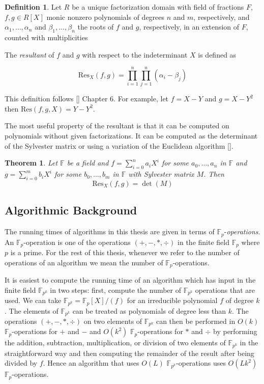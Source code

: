 \documentclass{article}
\newcounter{dummy} \numberwithin{dummy}{section}
\theoremstyle{plain}
\newtheorem{thm}[dummy]{Theorem}
\theoremstyle{definition}
\newtheorem{mydef}[dummy]{Definition}
\def\Fp {{ \mathbb{F} _ {p} }}
\def\Res {{ \mathrm{Res}}}
\begin{document}
		\begin{mydef} 
				\label{DEF:ResDef}
				Let $R$ be a unique factorization domain with field of fractions $F$, $f,g \in R[X]$ monic nonzero polynomials of degrees $n$ and $m$, respectively, and $\alpha_1,\ldots,\alpha_n$ and $\beta_1,\ldots, \beta_n$ the roots of $f$ and $g$, respectively, in an extension of $F$, counted with multiplicities 

				The \emph{resultant} of $f$ and $g$ with respect to the indeterminant $X$ is defined as

				\[ \Res_{X}(f,g)=\prod_{i=1}^n {\prod_{j=1}^n { ( \alpha_i-\beta_j ) }  } \]
		\end{mydef}
		
		This definition follows [] Chapter 6. For example, let $f=X-Y$ and $g=X-Y^2 $ then $\Res(f,g,X)=Y-Y^2$.
		
		The most useful property of the resultant is that it can be computed on polynomials without given factorizations. It can be computed as the determinant of the Sylvester matrix or using a variation of the Euclidean algorithm []. 	
		
		\begin{thm}
		\label{THM:rescomp}
		    Let $\mathbb{F}$ be a field and $f=\sum_{i=0}^n{a_iX^i}$ for some $a_0,\ldots,a_n$ in $\mathbb{F}$ and $g=\sum_{i=0}^m{b_iX^i}$ for some $b_0,\ldots,b_m$ in $\mathbb{F}$ with Sylvester matrix $M$. Then
		    \[ \Res_{X}(f,g)=\det(M) \]
		\end{thm}
				
		\subsection{Algorithmic Background}
		\label{SEC:AlgBack}
		
		The running times of algorithms in this thesis are given in terms of $\Fp$-\emph{operations}. An $\Fp$-operation is one of the operations $(+,-,*,\div)$ in the finite field $\Fp$ where $p$ is a prime. For the rest of this thesis, whenever we refer to the number of operations of an algorithm we mean the number of $\Fp$-operations. 
		
		It is easiest to compute the running time of an algorithm which has input in the finite field $\mathbb{F}_{p^k}$ in two steps: first, compute the number of $\mathbb{F}_{p^k}$ operations that are used. We can take $\mathbb{F}_{p^k}=\Fp[X]/(f)$ for an irreducible polynomial $f$ of degree $k$. The elements of $\mathbb{F}_{p^k}$ can be treated as polynomials of degree less than $k$. The operations $(+,-,*,\div)$ on two elements of $\mathbb{F}_{p^k}$ can then be performed in $O(k)$ $\Fp$-operations for $+$ and $-$ and $O(k^2)$ $\Fp$-operations for $*$ and $\div$ by performing the addition, subtraction, multiplication, or division of two elements of $\mathbb{F}_{p^k}$ in the straightforward way and then computing the remainder of the result after being divided by $f$. Hence an algorithm that uses $O(L)$ $\mathbb{F}_{p^k}$-operations uses $O(Lk^2)$ $\Fp$-operations. 
		
\end{document}
